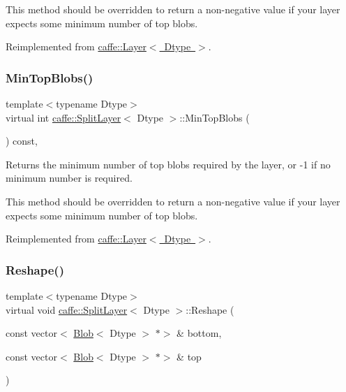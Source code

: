 This method should be overridden to return a non-\/negative value if your layer expects some minimum number of top blobs. 

Reimplemented from \mbox{\hyperlink{classcaffe_1_1_layer_ab9e4c8d642e413948b131d851a8462a4}{caffe\+::\+Layer$<$ Dtype $>$}}.

\mbox{\label{classcaffe_1_1_split_layer_a48dafac272f2f098798e3caa09afbabe}} 
\subsubsection{\texorpdfstring{Min\+Top\+Blobs()}{MinTopBlobs()}\hspace{0.1cm}{\footnotesize\ttfamily [2/2]}}
{\footnotesize\ttfamily template$<$typename Dtype$>$ \\
virtual int \mbox{\hyperlink{classcaffe_1_1_split_layer}{caffe\+::\+Split\+Layer}}$<$ Dtype $>$\+::Min\+Top\+Blobs (\begin{DoxyParamCaption}{ }\end{DoxyParamCaption}) const\hspace{0.3cm}{\ttfamily [inline]}, {\ttfamily [virtual]}}



Returns the minimum number of top blobs required by the layer, or -\/1 if no minimum number is required. 

This method should be overridden to return a non-\/negative value if your layer expects some minimum number of top blobs. 

Reimplemented from \mbox{\hyperlink{classcaffe_1_1_layer_ab9e4c8d642e413948b131d851a8462a4}{caffe\+::\+Layer$<$ Dtype $>$}}.

\mbox{\label{classcaffe_1_1_split_layer_a1064977331e5bfcf5d75590d14986e1f}} 
\subsubsection{\texorpdfstring{Reshape()}{Reshape()}\hspace{0.1cm}{\footnotesize\ttfamily [1/2]}}
{\footnotesize\ttfamily template$<$typename Dtype$>$ \\
virtual void \mbox{\hyperlink{classcaffe_1_1_split_layer}{caffe\+::\+Split\+Layer}}$<$ Dtype $>$\+::Reshape (\begin{DoxyParamCaption}\item[{const vector$<$ \mbox{\hyperlink{classcaffe_1_1_blob}{Blob}}$<$ Dtype $>$ $\ast$$>$ \&}]{bottom,  }\item[{const vector$<$ \mbox{\hyperlink{classcaffe_1_1_blob}{Blob}}$<$ Dtype $>$ $\ast$$>$ \&}]{top }\end{DoxyParamCaption})\hspace{0.3cm}{\ttfamily [virtual]}}



